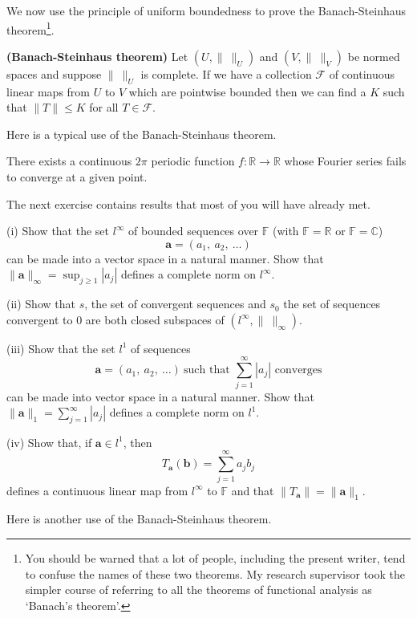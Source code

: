 We now use the principle of uniform boundedness to prove
the Banach-Steinhaus theorem\footnote{You should be warned that
a lot of people, including the present writer, tend to
confuse the names of these two theorems. My research supervisor
took the simpler course of referring to all the theorems
of functional analysis as `Banach's theorem'.}.
\begin{theorem}{\bf (Banach-Steinhaus theorem)}%
\label{Theorem, Banach Steinhaus}
Let $(U,\|\ \|_{U})$ and $(V,\|\ \|_{V})$ be normed
spaces and suppose $\|\ \|_{U}$ is complete.
If we have a collection ${\mathcal F}$ of continuous
linear maps from $U$ to $V$ which are pointwise bounded
then we can find a $K$ such that $\|T\|\leq K$
for all $T\in{\mathcal F}$.
\end{theorem}

Here is a typical use of the Banach-Steinhaus theorem.
\begin{theorem} There exists a continuous
$2\pi$ periodic function $f:{\mathbb R}\rightarrow{\mathbb R}$
whose Fourier series fails to converge at a given point.
\end{theorem}
The next exercise contains results that most
of you will have already met.
\begin{exercise} (i) Show that the set $l^{\infty}$ of
bounded sequences over ${\mathbb F}$ (with
${\mathbb F}={\mathbb R}$ or ${\mathbb F}={\mathbb C}$) 
\[{\mathbf a}=(a_{1},\ a_{2},\ \dots)\]
can be made into a vector space in a natural manner.
Show that $\|{\mathbf a}\|_{\infty}=\sup_{j\geq 1}|a_{j}|$
defines a complete norm on $l^{\infty}$.

(ii) Show that $s$, the set of convergent sequences
and $s_{0}$ the set of sequences convergent to $0$
are both closed subspaces of $(l^{\infty},\|\ \|_{\infty})$.

(iii) Show that the set $l^{1}$ of
sequences
\[{\mathbf a}=(a_{1},\ a_{2},\ \dots)
\ \text{such that $\sum_{j=1}^{\infty}|a_{j}|$ converges}\]
can be made into vector space in a natural manner.
Show that $\|{\mathbf a}\|_{1}=\sum_{j=1}^{\infty}|a_{j}|$
defines a complete norm on $l^{1}$.

(iv) Show that, if ${\mathbf a}\in l^{1}$, then
\[T_{\mathbf a}({\mathbf b})=\sum_{j=1}^{\infty}a_{j}b_{j}\]
defines a continuous linear map from $l^{\infty}$ to ${\mathbb F}$
and that $\|T_{\mathbf a}\|=\|{\mathbf a}\|_{1}$.
\end{exercise}
Here is another use of the Banach-Steinhaus theorem.
